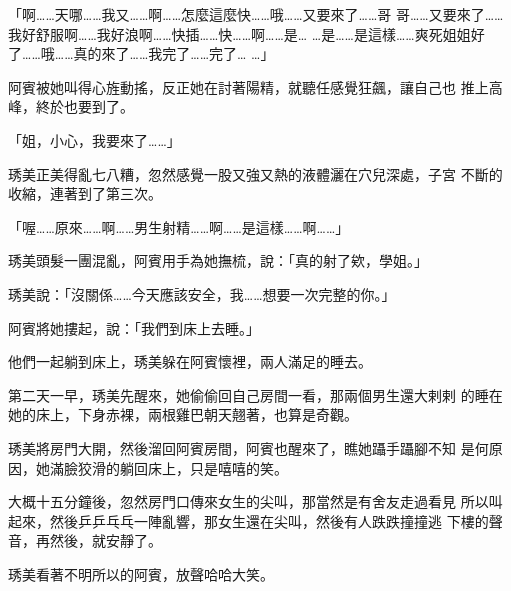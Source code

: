 「啊……天哪……我又……啊……怎麼這麼快……哦……又要來了……哥
哥……又要來了……我好舒服啊……我好浪啊……快插……快……啊……是…
…是……是這樣……爽死姐姐好了……哦……真的來了……我完了……完了…
…」

阿賓被她叫得心旌動搖，反正她在討著陽精，就聽任感覺狂飆，讓自己也
推上高峰，終於也要到了。

「姐，小心，我要來了……」

琇美正美得亂七八糟，忽然感覺一股又強又熱的液體灑在穴兒深處，子宮
不斷的收縮，連著到了第三次。

「喔……原來……啊……男生射精……啊……是這樣……啊……」

琇美頭髮一團混亂，阿賓用手為她撫梳，說：「真的射了欸，學姐。」

琇美說：「沒關係……今天應該安全，我……想要一次完整的你。」

阿賓將她摟起，說：「我們到床上去睡。」

他們一起躺到床上，琇美躲在阿賓懷裡，兩人滿足的睡去。

第二天一早，琇美先醒來，她偷偷回自己房間一看，那兩個男生還大剌剌
的睡在她的床上，下身赤裸，兩根雞巴朝天翹著，也算是奇觀。

琇美將房門大開，然後溜回阿賓房間，阿賓也醒來了，瞧她躡手躡腳不知
是何原因，她滿臉狡滑的躺回床上，只是嘻嘻的笑。

大概十五分鐘後，忽然房門口傳來女生的尖叫，那當然是有舍友走過看見
所以叫起來，然後乒乒乓乓一陣亂響，那女生還在尖叫，然後有人跌跌撞撞逃
下樓的聲音，再然後，就安靜了。

琇美看著不明所以的阿賓，放聲哈哈大笑。










